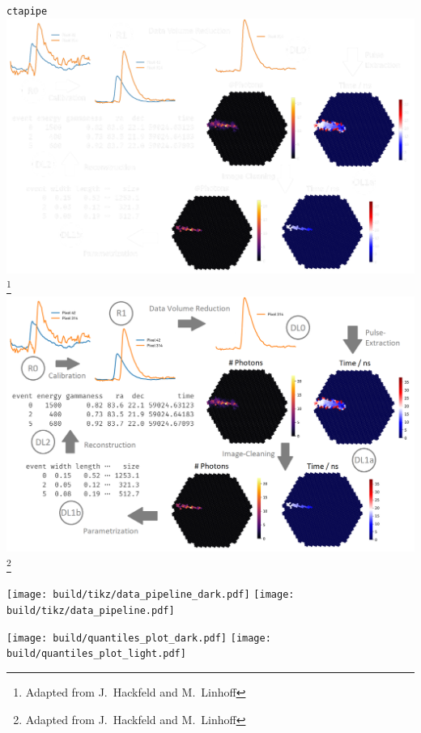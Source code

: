 \begin{frame}{\texttt{ctapipe}}
    {%
    \centering
    \includegraphics[height=0.9\textheight]{graphics/ctapipe_light.pdf}
    \vspace{-0.25cm}
    \footnote{\textcolor{white!85!black}{Adapted from J.~Hackfeld and M.~Linhoff}}
    }
    {%
    \centering
    \includegraphics[height=0.9\textheight]{graphics/ctapipe.png}
    \vspace{-0.25cm}
    \footnote{\textcolor{darkgray!85!black}{Adapted from J.~Hackfeld and M.~Linhoff}}
    }
\end{frame}

\begin{frame}
    {%
    \centering
    \texttt{[image: build/tikz/data\_pipeline\_dark.pdf]}
    }
    {%
    \centering
    \texttt{[image: build/tikz/data\_pipeline.pdf]}
    }
\end{frame}

    {%
    
    }
    {%
    
    }
\begin{frame}
    {%
    \centering
    \texttt{[image: build/quantiles\_plot\_dark.pdf]}
    }
    {%
    \centering
    \texttt{[image: build/quantiles\_plot\_light.pdf]}
    }
\end{frame}
